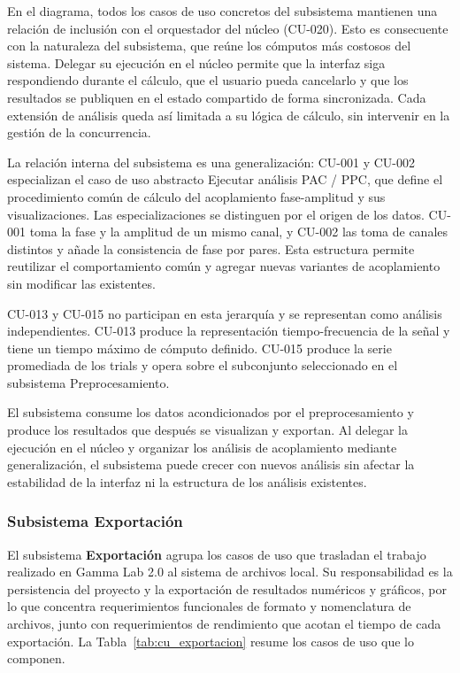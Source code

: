 \documentclass[11pt,a4paper]{article}
\DeclareRobustCommand{\_}{\textunderscore\allowbreak}
\begin{document}
En el diagrama, todos los casos de uso concretos del subsistema mantienen una relaci\'on de inclusi\'on con el orquestador del n\'ucleo (CU-020). Esto es consecuente con la naturaleza del subsistema, que re\'une los c\'omputos m\'as costosos del sistema. Delegar su ejecuci\'on en el n\'ucleo permite que la interfaz siga respondiendo durante el c\'alculo, que el usuario pueda cancelarlo y que los resultados se publiquen en el estado compartido de forma sincronizada. Cada extensi\'on de an\'alisis queda as\'i limitada a su l\'ogica de c\'alculo, sin intervenir en la gesti\'on de la concurrencia.

La relaci\'on interna del subsistema es una generalizaci\'on: CU-001 y CU-002 especializan el caso de uso abstracto Ejecutar an\'alisis PAC / PPC, que define el procedimiento com\'un de c\'alculo del acoplamiento fase-amplitud y sus visualizaciones. Las especializaciones se distinguen por el origen de los datos. CU-001 toma la fase y la amplitud de un mismo canal, y CU-002 las toma de canales distintos y a\~nade la consistencia de fase por pares. Esta estructura permite reutilizar el comportamiento com\'un y agregar nuevas variantes de acoplamiento sin modificar las existentes.

CU-013 y CU-015 no participan en esta jerarqu\'ia y se representan como an\'alisis independientes. CU-013 produce la representaci\'on tiempo-frecuencia de la se\~nal y tiene un tiempo m\'aximo de c\'omputo definido. CU-015 produce la serie promediada de los trials y opera sobre el subconjunto seleccionado en el subsistema Preprocesamiento.

El subsistema consume los datos acondicionados por el preprocesamiento y produce los resultados que despu\'es se visualizan y exportan. Al delegar la ejecuci\'on en el n\'ucleo y organizar los an\'alisis de acoplamiento mediante generalizaci\'on, el subsistema puede crecer con nuevos an\'alisis sin afectar la estabilidad de la interfaz ni la estructura de los an\'alisis existentes.

\subsubsection{Subsistema Exportaci\'on}

El subsistema \textbf{Exportaci\'on} agrupa los casos de uso que trasladan el trabajo realizado en Gamma Lab 2.0 al sistema de archivos local. Su responsabilidad es la persistencia del proyecto y la exportaci\'on de resultados num\'ericos y gr\'aficos, por lo que concentra requerimientos funcionales de formato y nomenclatura de archivos, junto con requerimientos de rendimiento que acotan el tiempo de cada exportaci\'on. La Tabla~\ref{tab:cu_exportacion} resume los casos de uso que lo componen.
\end{document}
